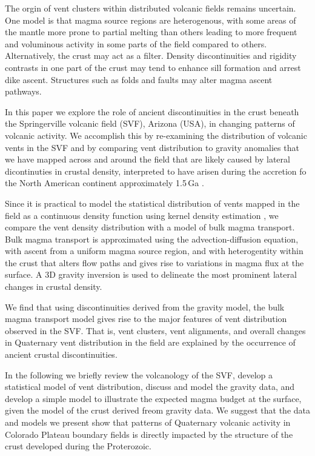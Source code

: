 \documentclass[draft,jgrga]{agutex}
\begin{document}
\begin{article}
The orgin of vent clusters within distributed volcanic fields remains uncertain. One model is that magma source regions are heterogenous, with some areas of the mantle more prone to partial melting than others leading to more frequent and voluminous activity in some parts of the field compared to others. Alternatively, the crust may act as a filter. Density discontinuities and rigidity contrasts in one part of the crust may tend to enhance sill formation and arrest dike ascent. Structures such as folds \citep{Wetmore2009} and faults \citep{vandenHove2017} may alter magma ascent pathways.

In this paper we explore the role of ancient discontinuities in the crust beneath the Springerville volcanic field (SVF), Arizona (USA), in changing patterns of volcanic activity. We accomplish this by re-examining the distribution of volcanic vents in the SVF and by comparing vent distribution to gravity anomalies that we have mapped across and around the field that are likely caused by lateral dicontinuties in crustal density, interpreted to have arisen during the accretion fo the North American continent approximately 1.5\,Ga \citep{Gilbert2007}. 

Since it is practical to model the statistical distribution of vents mapped in the field as a continuous density function using kernel density estimation \citep{Connor1995, Connor2009, Germa2013}, we compare the vent density distribution with a model of bulk magma transport. Bulk magma transport is approximated using the advection-diffusion equation, with ascent from a uniform magma source region, and with heterogentity within the crust that alters flow paths and gives rise to variations in magma flux at the surface. A 3D gravity inversion \citep{White2015} is used to delineate the most prominent lateral changes in crustal density. 

We find that using discontinuities derived from the gravity model, the bulk magma transport model gives rise to the major features of vent distribution observed in the SVF. That is, vent clusters, vent alignments, and overall changes in Quaternary vent distribution in the field are explained by the occurrence of ancient crustal discontinuities.

In the following we briefly review the volcanology of the SVF, develop a statistical model of vent distribution, discuss and model the gravity data, and develop a simple model to illustrate the expected magma budget at the surface, given the model of the crust derived  freom gravity data. We suggest that the data and models we present show that patterns of Quaternary volcanic activity in Colorado Plateau boundary fields is directly impacted by the structure of the crust developed during the Proterozoic.



\end{article}
\end{document}
